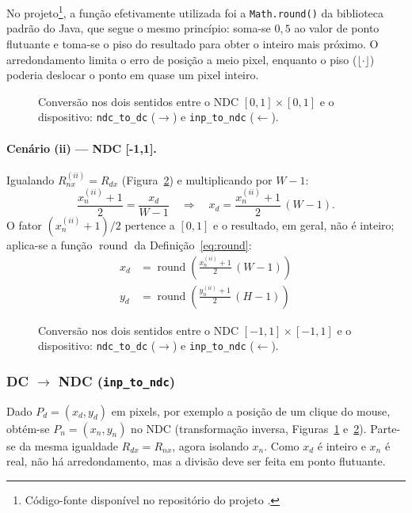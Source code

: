 No projeto\footnote{Código-fonte disponível no repositório do projeto \cite{repo}.}, a função efetivamente utilizada foi a \texttt{Math.round()} da biblioteca padrão do Java, que segue o mesmo princípio: soma-se $0{,}5$ ao valor de ponto flutuante e toma-se o piso do resultado para obter o inteiro mais próximo.
O arredondamento limita o erro de posição a meio pixel, enquanto o piso ($\lfloor \cdot \rfloor$) poderia deslocar o ponto em quase um pixel inteiro.

\begin{figure}[H]
    \centering
    \mapafig{\presetndci}{\presetdc}
    \caption{Conversão nos dois sentidos entre o NDC $[0,1] \times [0,1]$ e o dispositivo: \texttt{ndc\_to\_dc} ($\rightarrow$) e \texttt{inp\_to\_ndc} ($\leftarrow$).}
    \label{fig:ndc01-dc}
\end{figure}

\paragraph{Cenário (ii) --- NDC [-1,1].} Igualando $R_{nx}^{(ii)} = R_{dx}$ (Figura~\ref{fig:ndc11-dc}) e multiplicando por $W-1$:
\[
    \frac{x_n^{(ii)} + 1}{2} = \frac{x_d}{W-1}
    \quad \Rightarrow \quad
    x_d = \frac{x_n^{(ii)} + 1}{2} \, (W-1).
\]
O fator $\left(x_n^{(ii)} + 1\right)/2$ pertence a $[0,1]$ e o resultado, em geral, não é inteiro; aplica-se a função $\operatorname{round}$ da Definição~\eqref{eq:round}:
\begin{equation}
    \boxed{\begin{aligned}
        x_d &= \operatorname{round}\!\left( \frac{x_n^{(ii)} + 1}{2} \, (W-1) \right) \\[2mm]
        y_d &= \operatorname{round}\!\left( \frac{y_n^{(ii)} + 1}{2} \, (H-1) \right)
    \end{aligned}}
    \label{eq:ndc-dc-ii}
\end{equation}

\begin{figure}[H]
    \centering
    \mapafig{\presetndcii}{\presetdc}
    \caption{Conversão nos dois sentidos entre o NDC $[-1,1] \times [-1,1]$ e o dispositivo: \texttt{ndc\_to\_dc} ($\rightarrow$) e \texttt{inp\_to\_ndc} ($\leftarrow$).}
    \label{fig:ndc11-dc}
\end{figure}

\subsubsection{\texorpdfstring{DC $\rightarrow$ NDC}{DC -> NDC} (\texttt{inp\_to\_ndc})}
Dado $P_d = (x_d, y_d)$ em pixels, por exemplo a posição de um clique do mouse, obtém-se $P_n = (x_n, y_n)$ no NDC (transformação inversa, Figuras~\ref{fig:ndc01-dc} e~\ref{fig:ndc11-dc}). Parte-se da mesma igualdade $R_{dx} = R_{nx}$, agora isolando $x_n$. Como $x_d$ é inteiro e $x_n$ é real, não há arredondamento, mas a divisão deve ser feita em ponto flutuante.


